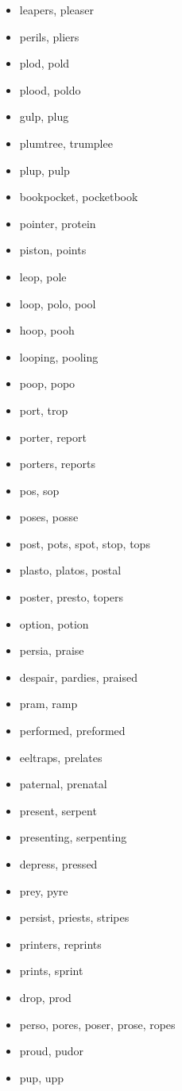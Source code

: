 \documentclass[a4wide,11pt]{report}
\begin{document}
\begin{itemize}
  \item leapers, pleaser
  \item perils, pliers
  \item plod, pold
  \item plood, poldo
  \item gulp, plug
  \item plumtree, trumplee
  \item plup, pulp
  \item bookpocket, pocketbook
  \item pointer, protein
  \item piston, points
  \item leop, pole
  \item loop, polo, pool
  \item hoop, pooh
  \item looping, pooling
  \item poop, popo
  \item port, trop
  \item porter, report
  \item porters, reports
  \item pos, sop
  \item poses, posse
  \item post, pots, spot, stop, tops
  \item plasto, platos, postal
  \item poster, presto, topers
  \item option, potion
  \item persia, praise
  \item despair, pardies, praised
  \item pram, ramp
  \item performed, preformed
  \item eeltraps, prelates
  \item paternal, prenatal
  \item present, serpent
  \item presenting, serpenting
  \item depress, pressed
  \item prey, pyre
  \item persist, priests, stripes
  \item printers, reprints
  \item prints, sprint
  \item drop, prod
  \item perso, pores, poser, prose, ropes
  \item proud, pudor
  \item pup, upp

\end{itemize}
\end{document}
